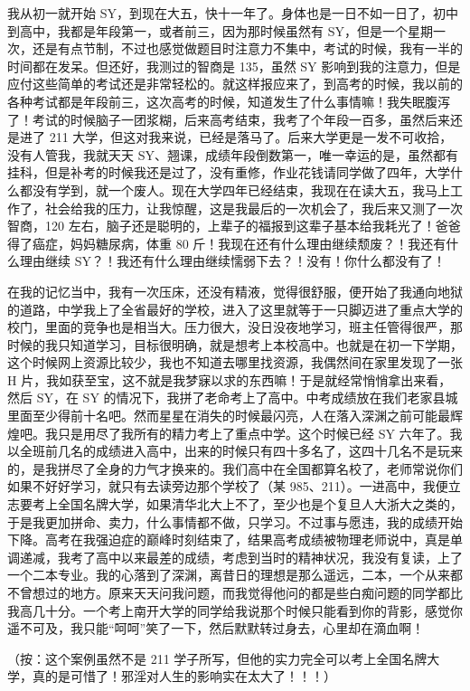 \begin{case}
    我从初一就开始 SY，到现在大五，快十一年了。身体也是一日不如一日了，初中到高中，我都是年段第一，或者前三，因为那时候虽然有 SY，但是一个星期一次，还是有点节制，不过也感觉做题目时注意力不集中，考试的时候，我有一半的时间都在发呆。但还好，我测过的智商是 135，虽然 SY 影响到我的注意力，但是应付这些简单的考试还是非常轻松的。就这样报应来了，到高考的时候，我以前的各种考试都是年段前三，这次高考的时候，知道发生了什么事情嘛！我失眠腹泻了！考试的时候脑子一团浆糊，后来高考结束，我考了个年段一百多，虽然后来还是进了 211 大学，但这对我来说，已经是落马了。后来大学更是一发不可收拾，没有人管我，我就天天 SY、翘课，成绩年段倒数第一，唯一幸运的是，虽然都有挂科，但是补考的时候我还是过了，没有重修，作业花钱请同学做了四年，大学什么都没有学到，就一个废人。现在大学四年已经结束，我现在在读大五，我马上工作了，社会给我的压力，让我惊醒，这是我最后的一次机会了，我后来又测了一次智商，120 左右，脑子还是聪明的，上辈子的福报到这辈子基本给我耗光了！爸爸得了癌症，妈妈糖尿病，体重 80 斤！我现在还有什么理由继续颓废？！我还有什么理由继续 SY？！我还有什么理由继续懦弱下去？！没有！你什么都没有了！
\end{case}

\begin{case}
    在我的记忆当中，我有一次压床，还没有精液，觉得很舒服，便开始了我通向地狱的道路，中学我上了全省最好的学校，进入了这里就等于一只脚迈进了重点大学的校门，里面的竞争也是相当大。压力很大，没日没夜地学习，班主任管得很严，那时候的我只知道学习，目标很明确，就是想考上本校高中。也就是在初一下学期，这个时候网上资源比较少，我也不知道去哪里找资源，我偶然间在家里发现了一张 H 片，我如获至宝，这不就是我梦寐以求的东西嘛！于是就经常悄悄拿出来看，然后 SY，在 SY 的情况下，我拼了老命考上了高中。中考成绩放在我们老家县城里面至少得前十名吧。然而星星在消失的时候最闪亮，人在落入深渊之前可能最辉煌吧。我只是用尽了我所有的精力考上了重点中学。这个时候已经 SY 六年了。我以全班前几名的成绩进入高中，出来的时候只有四十多名了，这四十几名不是玩来的，是我拼尽了全身的力气才换来的。我们高中在全国都算名校了，老师常说你们如果不好好学习，就只有去读旁边那个学校了（某 985、211）。一进高中，我便立志要考上全国名牌大学，如果清华北大上不了，至少也是个复旦人大浙大之类的，于是我更加拼命、卖力，什么事情都不做，只学习。不过事与愿违，我的成绩开始下降。高考在我强迫症的巅峰时刻结束了，结果高考成绩被物理老师说中，真是单调递减，我考了高中以来最差的成绩，考虑到当时的精神状况，我没有复读，上了一个二本专业。我的心落到了深渊，离昔日的理想是那么遥远，二本，一个从来都不曾想过的地方。原来天天问我问题，而我觉得他问的都是些白痴问题的同学都比我高几十分。一个考上南开大学的同学给我说那个时候只能看到你的背影，感觉你遥不可及，我只能“呵呵”笑了一下，然后默默转过身去，心里却在滴血啊！

    （按：这个案例虽然不是 211 学子所写，但他的实力完全可以考上全国名牌大学，真的是可惜了！邪淫对人生的影响实在太大了！！！）
\end{case}


